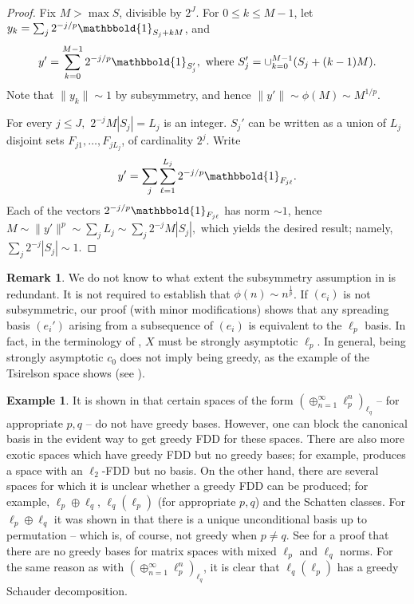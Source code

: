 \documentclass[12pt,leqno]{amsart}
\numberwithin{equation}{section}
\theoremstyle{definition}
\newtheorem{remark}[theorem]{Remark}
\newtheorem{example}[theorem]{Example}
\def\one{\mathbbold{1}}
\begin{document}
\begin{proof}
Fix $M > \max S$, divisible by $2^J$. For $0\leq k\leq M-1$, let $y_k=\sum_j2^{-j/p}\one_{S_j+kM}$, and 
$$y'=\sum_{k=0}^{M-1}2^{-j/p}\one_{S_j'}, \ \text{where} \ S_j'=\cup_{k=0}^{M-1}(S_j+(k-1)M).$$
Note that $\|y_k\|\sim 1$ by subsymmetry, and hence $\|y'\|\sim\phi(M)\sim M^{1/p}$. 
\medskip

For every $j\leq J,$ $2^{-j}M|S_j| = L_j$ is an integer.  $S_j'$ can be written as a union of $L_j$ disjoint sets $F_{j1},\dots, F_{jL_j}$, of cardinality $2^j$. Write
$$y'=\sum_j\sum_{\ell=1}^{L_j}2^{-j/p}\one_{F_{j\ell}}.$$
Each of the vectors $2^{-j/p}\one_{F_{j\ell}}$ has norm $\sim 1$, hence $M\sim \|y'\|^p\sim \sum_jL_j\sim \sum_j2^{-j}M|S_j|,$ which yields the desired result; namely, $\sum_j2^{-j}|S_j|\sim 1$.
\end{proof}

\begin{remark}
We do not know to what extent the subsymmetry assumption in  is redundant. It is not required to establish that $\phi(n)\sim n^\frac{1}{p}$. If $(e_i)$ is not subsymmetric, our proof (with minor modifications) shows that any spreading basis $(e_i')$ arising from a subsequence of $(e_i)$ is equivalent to the $\ell_p$ basis. In fact, in the terminology of \cite{2}, $X$ must be strongly asymptotic $\ell_p$. In general, being strongly asymptotic $c_0$ does not imply being greedy, as the example of the Tsirelson space shows (see \cite[Remark 5.8]{3}).
\end{remark}
\begin{example}
It is shown in \cite{NoGreedy} that certain spaces of the form $(\oplus_{n=1}^{\infty} \ell_p^n)_{\ell_q}$ -- for appropriate $p,q$ -- do not have greedy bases. However, one can block the canonical basis in the evident way to get greedy FDD for these spaces. There are also more exotic spaces which have greedy FDD but no greedy bases; for example, \cite{Szarek} produces a space with an $\ell_2$-FDD but no basis.  On the other hand, there are several spaces for which it is unclear whether a greedy FDD can be produced; for example, $\ell_p\oplus \ell_q$, $\ell_q(\ell_p)$ (for appropriate $p,q$) and the Schatten classes. For  $\ell_p\oplus \ell_q$ it was shown in \cite{EW76,W78} that there is a unique unconditional basis up to permutation -- which is, of course, not greedy when $p\neq q$. See \cite{Schechtman} for a proof that there are no greedy bases for matrix spaces with mixed $\ell_p$ and $\ell_q$ norms. For the same reason as with $(\oplus_{n=1}^{\infty} \ell_p^n)_{\ell_q}$, it is clear that $\ell_q(\ell_p)$ has a greedy Schauder decomposition.
\end{example}
\end{document}
